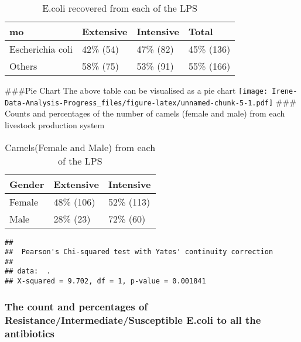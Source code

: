 \documentclass[
]{article}
\begin{document}
\begin{table}

\caption{\label{tab:unnamed-chunk-4}E.coli recovered from each of the LPS}
\centering
\begin{tabular}[t]{l|l|l|l}
\hline
mo & Extensive & Intensive & Total\\
\hline
Escherichia coli & 42\% (54) & 47\% (82) & 45\% (136)\\
\hline
Others & 58\% (75) & 53\% (91) & 55\% (166)\\
\hline
\end{tabular}
\end{table}

\#\#\#Pie Chart The above table can be visualised as a pie chart
\texttt{[image: Irene-Data-Analysis-Progress\_files/figure-latex/unnamed-chunk-5-1.pdf]}
\#\#\# Counts and percentages of the number of camels (female and male)
from each livestock production system

\begin{table}

\caption{\label{tab:unnamed-chunk-6}Camels(Female and Male) from each of the LPS}
\centering
\begin{tabular}[t]{l|l|l}
\hline
Gender & Extensive & Intensive\\
\hline
Female & 48\% (106) & 52\% (113)\\
\hline
Male & 28\%  (23) & 72\%  (60)\\
\hline
\end{tabular}
\end{table}

\begin{verbatim}
## 
##  Pearson's Chi-squared test with Yates' continuity correction
## 
## data:  .
## X-squared = 9.702, df = 1, p-value = 0.001841
\end{verbatim}

\hypertarget{the-count-and-percentages-of-resistanceintermediatesusceptible-e.coli-to-all-the-antibiotics}{%
\subsubsection{The count and percentages of
Resistance/Intermediate/Susceptible E.coli to all the
antibiotics}\label{the-count-and-percentages-of-resistanceintermediatesusceptible-e.coli-to-all-the-antibiotics}}
\end{document}
